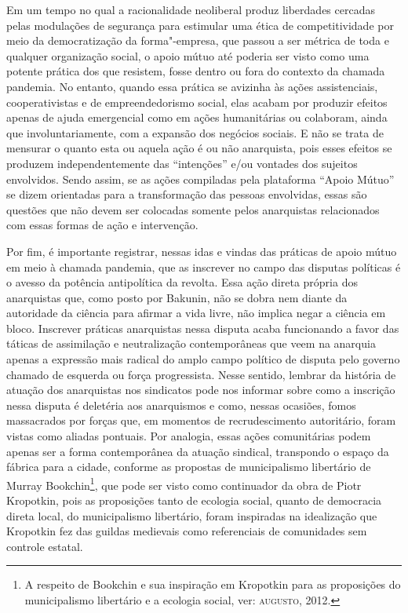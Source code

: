 Em um tempo no qual a racionalidade neoliberal produz liberdades
cercadas pelas modulações de segurança para estimular uma ética de
competitividade por meio da democratização da forma"-empresa, que passou
a ser métrica de toda e qualquer organização social, o apoio mútuo até
poderia ser visto como uma potente prática dos que resistem, fosse
dentro ou fora do contexto da chamada pandemia. No entanto, quando essa
prática se avizinha às ações assistenciais, cooperativistas e de
empreendedorismo social, elas acabam por produzir efeitos apenas de
ajuda emergencial como em ações humanitárias ou colaboram, ainda que
involuntariamente, com a expansão dos negócios sociais. E não se trata
de mensurar o quanto esta ou aquela ação é ou não anarquista, pois esses
efeitos se produzem independentemente das ``intenções'' e/ou vontades
dos sujeitos envolvidos. Sendo assim, se as ações compiladas pela
plataforma ``Apoio Mútuo'' se dizem orientadas para a transformação das
pessoas envolvidas, essas são questões que não devem ser colocadas
somente pelos anarquistas relacionados com essas formas de ação e
intervenção.

Por fim, é importante registrar, nessas idas e vindas das práticas de
apoio mútuo em meio à chamada pandemia, que as inscrever no campo das
disputas políticas é o avesso da potência antipolítica da revolta. Essa
ação direta própria dos anarquistas que, como posto por Bakunin, não se
dobra nem diante da autoridade da ciência para afirmar a vida livre, não
implica negar a ciência em bloco. Inscrever práticas anarquistas nessa
disputa acaba funcionando a favor das táticas de assimilação e
neutralização contemporâneas que veem na anarquia apenas a expressão
mais radical do amplo campo político de disputa pelo governo chamado de
esquerda ou força progressista. Nesse sentido, lembrar da história de
atuação dos anarquistas nos sindicatos pode nos informar sobre como a
inscrição nessa disputa é deletéria aos anarquismos e como, nessas
ocasiões, fomos massacrados por forças que, em momentos de
recrudescimento autoritário, foram vistas como aliadas pontuais. Por
analogia, essas ações comunitárias podem apenas ser a forma
contemporânea da atuação sindical, transpondo o espaço da fábrica para a
cidade, conforme as propostas de municipalismo libertário de Murray
Bookchin\footnote{A respeito de Bookchin e sua inspiração em Kropotkin
  para as proposições do municipalismo libertário e a ecologia social,
  ver: \textsc{augusto}, 2012.}, que pode ser visto como continuador da obra de
Piotr Kropotkin, pois as proposições tanto de ecologia social, quanto de
democracia direta local, do municipalismo libertário, foram inspiradas
na idealização que Kropotkin fez das guildas medievais como referenciais
de comunidades sem controle estatal.

